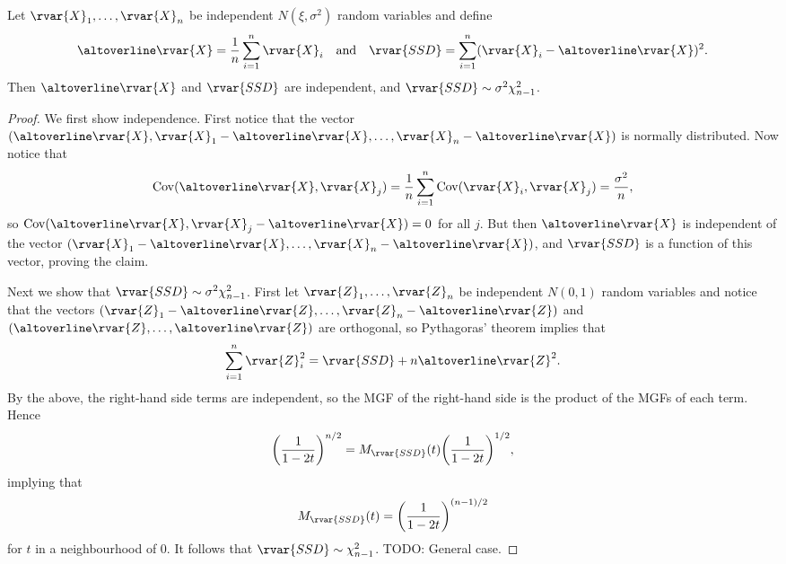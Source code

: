 \documentclass[article, a4paper, 11pt, oneside]{memoir}
\numberwithin{equation}{chapter}
\begin{document}
\begin{proposition}
    Let $\rvar{X}_1, \ldots, \rvar{X}_n$ be independent $N(\xi,\sigma^2)$ random variables and define
    \begin{equation*}
        \avg{\rvar{X}}
            = \frac{1}{n} \sum_{i=1}^n \rvar{X}_i
        \quad \text{and} \quad
        \rvar{SSD}
            = \sum_{i=1}^n (\rvar{X}_i - \avg{\rvar{X}})^2.
    \end{equation*}
    Then $\avg{\rvar{X}}$ and $\rvar{SSD}$ are independent, and $\rvar{SSD} \sim \sigma^2 \chi^2_{n-1}$.
\end{proposition}

\begin{proof}
    We first show independence. First notice that the vector $(\avg{\rvar{X}}, \rvar{X}_1 - \avg{\rvar{X}}, \ldots, \rvar{X}_n - \avg{\rvar{X}})$ is normally distributed. Now notice that
    \begin{equation*}
        \cov(\avg{\rvar{X}}, \rvar{X}_j)
            = \frac{1}{n} \sum_{i=1}^n \cov(\rvar{X}_i, \rvar{X}_j)
            = \frac{\sigma^2}{n},
    \end{equation*}
    so $\cov(\avg{\rvar{X}}, \rvar{X}_j - \avg{\rvar{X}}) = 0$ for all $j$. But then $\avg{\rvar{X}}$ is independent of the vector $(\rvar{X}_1 - \avg{\rvar{X}}, \ldots, \rvar{X}_n - \avg{\rvar{X}})$, and $\rvar{SSD}$ is a function of this vector, proving the claim.

    Next we show that $\rvar{SSD} \sim \sigma^2 \chi^2_{n-1}$. First let $\rvar{Z}_1, \ldots, \rvar{Z}_n$ be independent $N(0,1)$ random variables and notice that the vectors $(\rvar{Z}_1 - \avg{\rvar{Z}}, \ldots, \rvar{Z}_n - \avg{\rvar{Z}})$ and $(\avg{\rvar{Z}}, \ldots, \avg{\rvar{Z}})$ are orthogonal, so Pythagoras' theorem implies that
    \begin{equation*}
        \sum_{i=1}^n \rvar{Z}_i^2
            = \rvar{SSD} + n \avg{\rvar{Z}}^2.
    \end{equation*}
    By the above, the right-hand side terms are independent, so the MGF of the right-hand side is the product of the MGFs of each term. Hence
    \begin{equation*}
        \biggl( \frac{1}{1 - 2t} \biggr)^{n/2}
            = M_{\rvar{SSD}}(t) \biggl( \frac{1}{1 - 2t} \biggr)^{1/2},
    \end{equation*}
    implying that
    \begin{equation*}
        M_{\rvar{SSD}}(t)
            = \biggl( \frac{1}{1 - 2t} \biggr)^{(n-1)/2}
    \end{equation*}
    for $t$ in a neighbourhood of $0$. It follows that $\rvar{SSD} \sim \chi^2_{n-1}$. TODO: General case.
\end{proof}


\nocite{*}

\printbibliography
\end{document}
